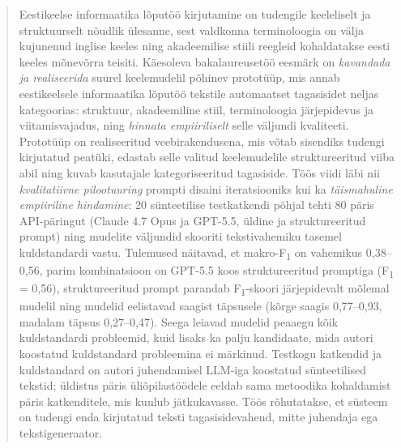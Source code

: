 \newpage
{} %

\begin{info}
\begin{abstract}
Eestikeelse informaatika lõputöö kirjutamine on tudengile keeleliselt ja struktuurselt nõudlik ülesanne, sest valdkonna terminoloogia on välja kujunenud inglise keeles ning akadeemilise stiili reegleid kohaldatakse eesti keeles mõnevõrra teisiti. Käesoleva bakalaureusetöö eesmärk on \emph{kavandada ja realiseerida} suurel keelemudelil põhinev prototüüp, mis annab eestikeelsele informaatika lõputöö tekstile automaatset tagasisidet neljas kategoorias: struktuur, akadeemiline stiil, terminoloogia järjepidevus ja viitamisvajadus, ning \emph{hinnata empiiriliselt} selle väljundi kvaliteeti. Prototüüp on realiseeritud veebirakendusena, mis võtab sisendiks tudengi kirjutatud peatüki, edastab selle valitud keelemudelile struktureeritud viiba abil ning kuvab kasutajale kategoriseeritud tagasiside. Töös viidi läbi nii \emph{kvalitatiivne pilootuuring} prompti disaini iteratsiooniks kui ka \emph{täismahuline empiiriline hindamine}: 20 sünteetilise testkatkendi põhjal tehti 80 päris API-päringut (Claude 4.7 Opus ja GPT-5.5, üldine ja struktureeritud prompt) ning mudelite väljundid skooriti tekstivahemiku tasemel kuldstandardi vastu. Tulemused näitavad, et makro-F\textsubscript{1} on vahemikus 0,38--0,56, parim kombinatsioon on GPT-5.5 koos struktureeritud promptiga (F\textsubscript{1} = 0,56), struktureeritud prompt parandab F\textsubscript{1}-skoori järjepidevalt mõlemal mudelil ning mudelid eelistavad saagist täpsusele (kõrge saagis 0,77--0,93, madalam täpsus 0,27--0,47). Seega leiavad mudelid peaaegu kõik kuldstandardi probleemid, kuid lisaks ka palju kandidaate, mida autori koostatud kuldstandard probleemina ei märkinud. Testkogu katkendid ja kuldstandard on autori juhendamisel LLM-iga koostatud sünteetilised tekstid; üldistus päris üliõpilastöödele eeldab sama metoodika kohaldamist päris katkenditele, mis kuulub jätkukavasse. Töös rõhutatakse, et süsteem on tudengi enda kirjutatud teksti tagasisidevahend, mitte juhendaja ega tekstigeneraator.
\end{abstract}


\end{info}


